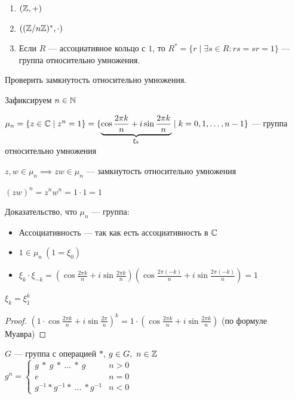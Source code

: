\begin{normalsize}
\begin{examples}
    \begin{enumerate}
        \item $(\mathbb{Z}, +)$
        \item $((\mathbb{Z}/n\mathbb{Z})^*, \cdot)$
        \item Если $R$ --- ассоциативное кольцо с $1$, то $R^* = \{r \mid \exists s \in R : rs = sr = 1\}$ --- группа относительно умножения.
    \end{enumerate}
\end{examples}

Проверить замкнутость относительно умножения. 

Зафиксируем $n \in \mathbb{N}$

$\mu_n = \{ z \in \mathbb{C} \mid z^n = 1\} = \{ \underbrace{\cos \frac{2 \pi k}{n} + i \sin \frac{2 \pi k}{n}}_{\xi_k} \mid k = 0, 1, \ldots, n-1 \}$ --- группа относительно умножения

$z, w \in \mu_n \implies zw \in \mu_n$ --- замкнутость относительно умножения

$(zw)^n = z^n w^n = 1 \cdot 1 = 1$

Доказательство, что $\mu_n$ --- группа:

\begin{itemize}
    \item Ассоциативность --- так как есть ассоциативность в $\mathbb{C}$
    
    \item $1 \in \mu_n~(1 = \xi_0)$
    
    \item $\xi_k \cdot \xi_{-k} = \left( \cos \frac{2 \pi k}{n} + i \sin \frac{2 \pi k}{n} \right) \left( \cos \frac{2 \pi (-k)}{n} + i \sin \frac{2 \pi (-k)}{n} \right) = 1$
\end{itemize}

\begin{lemma}
    $\xi_k = \xi_1^k$
\end{lemma}

\begin{proof}
    $\left(1 \cdot \cos \frac{2 \pi k}{n} + i \sin \frac{2 \pi}{n}\right)^k = 1 \cdot \left( \cos \frac{2 \pi k}{n} + i \sin \frac{2 \pi k}{n} \right)$ (по формуле Муавра)
\end{proof}

\begin{defn}
    $G$ --- группа с операцией $*$, $g \in G,~n \in \mathbb{Z}$\\

    $g^n = \begin{cases}
        g~*~g~*~\ldots~*~g & n > 0 \\
        e & n = 0 \\
        g^{-1} * g^{-1} *~\ldots~* g^{-1} & n < 0
    \end{cases}$
\end{defn}


\end{normalsize}
